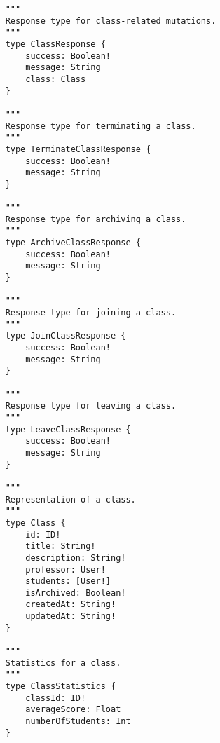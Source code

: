 \begin{verbatim}
	"""
	Response type for class-related mutations.
	"""
	type ClassResponse {
		success: Boolean!
		message: String
		class: Class
	}
	
	"""
	Response type for terminating a class.
	"""
	type TerminateClassResponse {
		success: Boolean!
		message: String
	}
	
	"""
	Response type for archiving a class.
	"""
	type ArchiveClassResponse {
		success: Boolean!
		message: String
	}
	
	"""
	Response type for joining a class.
	"""
	type JoinClassResponse {
		success: Boolean!
		message: String
	}
	
	"""
	Response type for leaving a class.
	"""
	type LeaveClassResponse {
		success: Boolean!
		message: String
	}
	
	"""
	Representation of a class.
	"""
	type Class {
		id: ID!
		title: String!
		description: String!
		professor: User!
		students: [User!]
		isArchived: Boolean!
		createdAt: String!
		updatedAt: String!
	}
	
	"""
	Statistics for a class.
	"""
	type ClassStatistics {
		classId: ID!
		averageScore: Float
		numberOfStudents: Int
	}
	
\end{verbatim}


